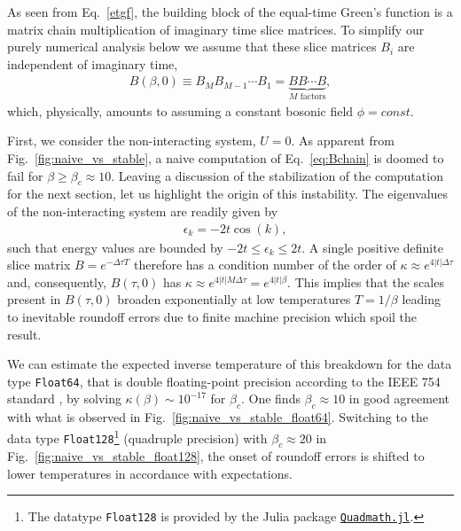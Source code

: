 \documentclass[submission, Phys]{SciPost}
\begin{document}
As seen from Eq.~\eqref{etgf}, the building block of the equal-time Green's function is a matrix chain multiplication of imaginary time slice matrices. To simplify our purely numerical analysis below we assume that these slice matrices $B_i$ are independent of imaginary time,
\begin{align}
	B(\beta, 0) \equiv B_M B_{M-1} \cdots B_1 = \underbrace{B B \cdots B}_{M \textrm{ factors}}, \label{eq:Bchain}
\end{align}
which, physically, amounts to assuming a constant bosonic field $\phi = \textit{const}$.

First, we consider the non-interacting system, $U=0$. As apparent from Fig.~\ref{fig:naive_vs_stable}, a naive computation of Eq.~\ref{eq:Bchain} is doomed to fail for $\beta \geq \beta_c \approx 10$. Leaving a discussion of the stabilization of the computation for the next section, let us highlight the origin of this instability. The eigenvalues of the non-interacting system are readily given by
\begin{align}
	&\epsilon_k = -2t\cos(k),
\end{align}
such that energy values are bounded by $-2t \leq \epsilon_k \leq 2t$. A single positive definite slice matrix $B = e^{-\Delta \tau T}$ therefore has a condition number of the order of $\kappa \approx e^{4|t|\Delta \tau}$ and, consequently, $B(\tau, 0)$ has $\kappa \approx e^{4|t|M\Delta \tau} = e^{4|t|\beta}$. This implies that the scales present in $B(\tau, 0)$ broaden exponentially at low temperatures $T=1/\beta$ leading to inevitable roundoff errors due to finite machine precision which spoil the result.

We can estimate the expected inverse temperature of this breakdown for the data type \texttt{Float64}, that is double floating-point precision according to the IEEE 754 standard \cite{Goldberg1991}, by solving $\kappa(\beta) \sim 10^{-17}$ for $\beta_c$. One finds $\beta_c \approx 10$ in good agreement with what is observed in Fig.~\ref{fig:naive_vs_stable_float64}. Switching to the data type \texttt{Float128}\footnote{The datatype \texttt{Float128} is provided by the Julia package \href{https://github.com/JuliaMath/Quadmath.jl}{\texttt{Quadmath.jl}}.} (quadruple precision) with $\beta_c \approx 20$ in Fig.~\ref{fig:naive_vs_stable_float128}, the onset of roundoff errors is shifted to lower temperatures in accordance with expectations.
\end{document}
